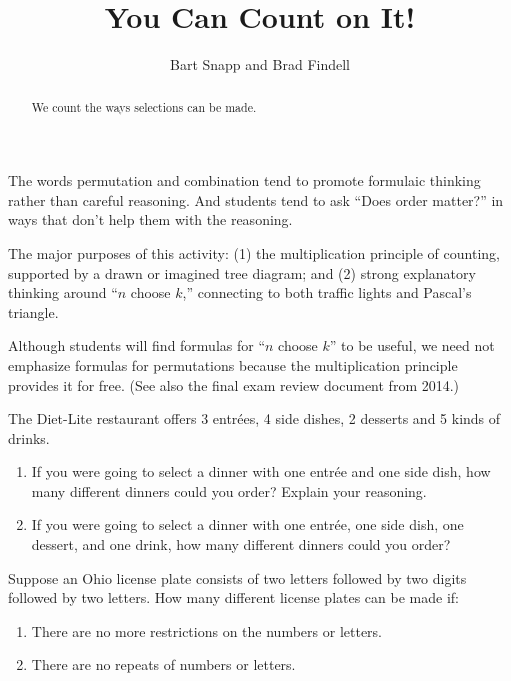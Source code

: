 \documentclass[nooutcomes]{ximera}
\title{You Can Count on It!}
\author{Bart Snapp and Brad Findell}
\begin{document}
\begin{abstract}
  We count the ways selections can be made.
\end{abstract}
\maketitle

\label{A:countOnIt}
\begin{teachingnote}
 The words permutation and combination tend to promote formulaic thinking rather than careful reasoning.  And students tend to ask ``Does order matter?'' in ways that don't help them with the reasoning. 

The major purposes of this activity: (1) the multiplication principle of counting, supported by a drawn or imagined tree diagram; and (2) strong explanatory thinking around ``$n$ choose $k$,'' connecting to both traffic lights and Pascal's triangle.  

Although students will find formulas for ``$n$ choose $k$'' to be useful, we need not emphasize formulas for permutations because the multiplication principle provides it for free.   (See also the final exam review document from 2014.)
\end{teachingnote}

\begin{problem}
The Diet-Lite restaurant offers 3 entr\'ees, 4 side dishes, 2 desserts
and 5 kinds of drinks.  
\begin{enumerate}
\item If you were going to select a dinner with one
entr\'ee and one side dish, how many different dinners could you order?  Explain your reasoning.  
\item If you were going to select a dinner with one
entr\'ee, one side dish, one dessert, and one drink, how many different
dinners could you order?
\end{enumerate}
\end{problem}

\begin{problem}
Suppose an Ohio license plate consists of two letters followed by two
digits followed by two letters.  How many different
license plates can be made if: 
\begin{enumerate}
\item There are no more restrictions on the
numbers or letters.
\item  There are no repeats of numbers or letters.
\end{enumerate}
\end{problem}
\end{document}
